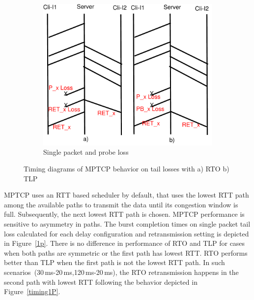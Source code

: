 \documentclass[10pt,conference,compsoc]{IEEEtran}
\begin{document}
\begin{figure}[!tbp]
 \hfill
 \begin{subfigure}[b]{0.32\textwidth}
  	\includegraphics[angle=0, width=\textwidth, natwidth=610, natheight=400]{images/timing1PP.pdf}
	\caption{Single packet and probe loss}\label{timing1PP}
 \end{subfigure}
 \caption{Timing diagrams of MPTCP behavior on tail losses with a) RTO b) TLP }	
\end{figure}


MPTCP uses an RTT based scheduler by default, that uses the lowest RTT path among the available paths to transmit
the data until its congestion window is full. Subsequently, the next lowest RTT path is chosen. MPTCP performance
is sensitive to asymmetry in paths. The burst completion times on single packet tail loss calculated for each delay 
configuration and retransmission setting is depicted in Figure~\ref{1p}. There is no difference in performance of RTO and TLP for 
cases when both paths are symmetric or the first path has lowest RTT. RTO performs better than TLP when the first path is not the lowest RTT path. In such
scenarios~(30\,ms-20\,ms,120\,ms-20\,ms), the RTO retransmission happens in the second path with lowest RTT following the behavior depicted
in Figure~\ref{timing1P}.
\end{document}
